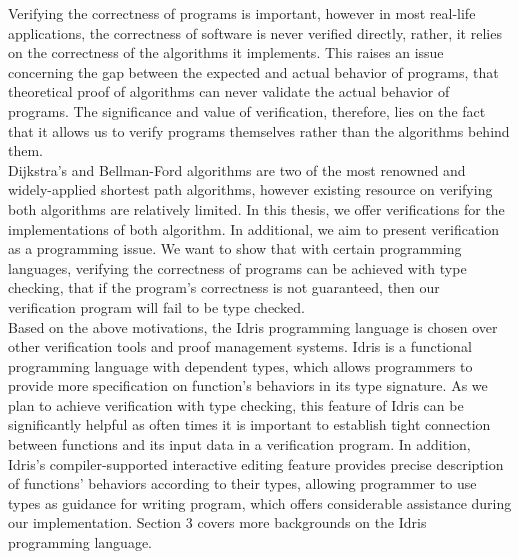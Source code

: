 
Verifying the correctness of programs is important, however in most real-life applications, the correctness of software is never verified directly, rather, it relies on the correctness of the algorithms it implements. This raises an issue concerning the gap between the expected and actual behavior of programs, that theoretical proof of algorithms can never validate the actual behavior of programs. The significance and value of verification, therefore, lies on the fact that it allows us to verify programs themselves rather than the algorithms behind them. 
\\ 

Dijkstra's and Bellman-Ford algorithms are two of the most renowned and widely-applied shortest path algorithms, however existing resource on verifying both algorithms are relatively limited. In this thesis, we offer verifications for the implementations of both algorithm. In additional, we aim to present verification as a programming issue. We want to show that with certain programming languages, verifying the correctness of programs can be achieved with type checking, that if the program's correctness is not guaranteed, then our verification program will fail to be type checked.
\\

Based on the above motivations, the Idris programming language is chosen over other verification tools and proof management systems. Idris is a functional programming language with dependent types, which allows programmers to provide more specification on function's behaviors in its type signature. As we plan to achieve verification with type checking, this feature of Idris can be significantly helpful as often times it is important to establish tight connection between functions and its input data in a verification program. In addition, Idris's compiler-supported interactive editing feature provides precise description of functions' behaviors according to their types, allowing programmer to use types as guidance for writing program, which offers considerable assistance during our implementation. Section 3 covers more backgrounds on the Idris programming language. 